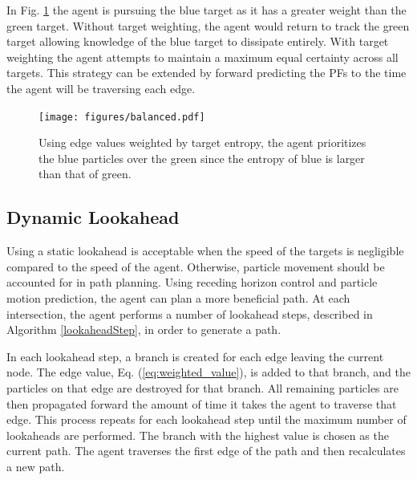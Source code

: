 \documentclass[letterpaper, 10 pt, conference]{ieeeconf}  %
\begin{document}
In Fig. \ref{fig:balanced} the agent is pursuing the blue target as it has a greater weight than the green target. Without target weighting, the agent would return to track the green target allowing knowledge of the blue target to dissipate entirely. With target weighting the agent attempts to maintain a maximum equal certainty across all targets. This strategy can be extended by forward predicting the PFs to the time the agent will be traversing each edge.

\begin{figure}
\centering
\texttt{[image: figures/balanced.pdf]}
\caption{Using edge values weighted by target entropy, the agent prioritizes the blue particles over the green since the entropy of blue is larger than that of green.}
\label{fig:balanced}
\end{figure}

\subsection{Dynamic Lookahead}
Using a static lookahead is acceptable when the speed of the targets is negligible compared to the speed of the agent. Otherwise, particle movement should be accounted for in path planning. Using receding horizon control and particle motion prediction, the agent can plan a more beneficial path. At each intersection, the agent performs a number of lookahead steps, described in Algorithm \ref{lookaheadStep}, in order to generate a path.

In each lookahead step, a branch is created for each edge leaving the current node. The edge value, Eq. (\ref{eq:weighted_value}), is added to that branch, and the particles on that edge are destroyed for that branch. All remaining particles are then propagated forward the amount of time it takes the agent to traverse that edge. This process repeats for each lookahead step until the maximum number of lookaheads are performed. The branch with the highest value is chosen as the current path. The agent traverses the first edge of the path and then recalculates a new path.


\end{document}
